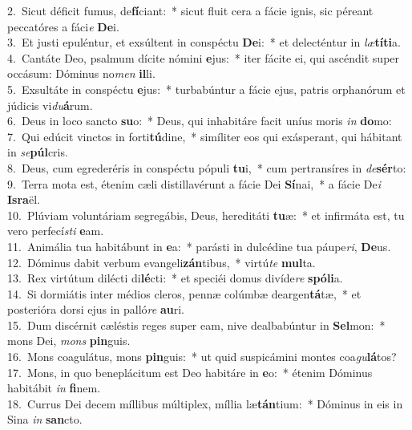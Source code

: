 {2.~}Sicut déficit fumus, de\textbf{fí}ciant:~* sicut fluit cera a fácie ignis, sic péreant peccatóres a fáci\textit{e} \textbf{De}i.\\
{3.~}Et justi epuléntur, et exsúltent in conspéctu \textbf{De}i:~* et delecténtur in \textit{læ}\textbf{tí}\textbf{ti}a.\\
{4.~}Cantáte Deo, psalmum dícite nómini \textbf{e}jus:~* iter fácite ei, qui ascéndit super occásum: Dóminus no\textit{men} \textbf{il}li.\\
{5.~}Exsultáte in conspéctu \textbf{e}jus:~* turbabúntur a fácie ejus, patris orphanórum et júdicis vi\textit{du}\textbf{á}rum.\\
{6.~}Deus in loco sancto \textbf{su}o:~* Deus, qui inhabitáre facit uníus moris \textit{in} \textbf{do}mo:\\
{7.~}Qui edúcit vinctos in forti\textbf{tú}dine,~* simíliter eos qui exásperant, qui hábitant in \textit{se}\textbf{púl}cris.\\
{8.~}Deus, cum egrederéris in conspéctu pópuli \textbf{tu}i,~* cum pertransíres in \textit{de}\textbf{sér}to:\\
{9.~}Terra mota est, étenim cæli distillavérunt a fácie Dei \textbf{Sí}nai,~* a fácie De\textit{i} \textbf{Is}\textbf{ra}ël.\\
{10.~}Plúviam voluntáriam segregábis, Deus, hereditáti \textbf{tu}æ:~* et infirmáta est, tu vero perfecí\textit{sti} \textbf{e}am.\\
{11.~}Animália tua habitábunt in \textbf{e}a:~* parásti in dulcédine tua páupe\textit{ri}, \textbf{De}us.\\
{12.~}Dóminus dabit verbum evangeli\textbf{zán}tibus,~* virtú\textit{te} \textbf{mul}ta.\\
{13.~}Rex virtútum dilécti di\textbf{lé}cti:~* et speciéi domus divíde\textit{re} \textbf{spó}\textbf{li}a.\\
{14.~}Si dormiátis inter médios cleros, pennæ colúmbæ deargen\textbf{tá}tæ,~* et posterióra dorsi ejus in palló\textit{re} \textbf{au}ri.\\
{15.~}Dum discérnit cæléstis reges super eam, nive dealbabúntur in \textbf{Sel}mon:~* mons Dei, \textit{mons} \textbf{pin}guis.\\
{16.~}Mons coagulátus, mons \textbf{pin}guis:~* ut quid suspicámini montes coa\textit{gu}\textbf{lá}tos?\\
{17.~}Mons, in quo beneplácitum est Deo habitáre in \textbf{e}o:~* étenim Dóminus habitábit \textit{in} \textbf{fi}nem.\\
{18.~}Currus Dei decem míllibus múltiplex, míllia læ\textbf{tán}tium:~* Dóminus in eis in Sina \textit{in} \textbf{san}cto.\\
